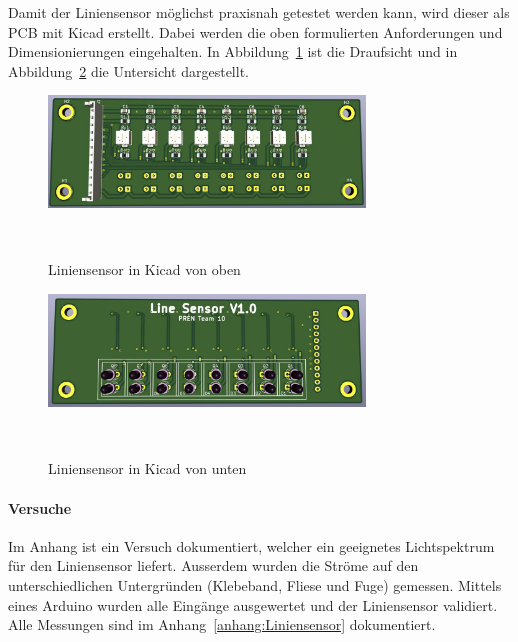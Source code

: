 \documentclass[main.tex]{subfiles} %
\begin{document}
Damit der Liniensensor möglichst praxisnah getestet 
werden kann, wird dieser als PCB mit Kicad erstellt. Dabei werden die 
oben formulierten Anforderungen und Dimensionierungen eingehalten. In Abbildung~\ref{fig:Liniensensor_Top} 
ist die Draufsicht und in Abbildung~\ref{fig:Liniensensor_Bottom} die Untersicht dargestellt.

\begin{figure}[H]
    \centering
    \includegraphics[width=0.75\textwidth]{fig_Strecke_Tracken/Liniensensor_Top.pdf}
    \caption{Liniensensor in Kicad von oben}~\label{fig:Liniensensor_Top}
\end{figure}

\begin{figure}[H]
    \centering
    \includegraphics[width=0.75\textwidth]{fig_Strecke_Tracken/Liniensensor_Bottom.pdf}
    \caption{Liniensensor in Kicad von unten}~\label{fig:Liniensensor_Bottom}
\end{figure}





\paragraph{Versuche}
Im Anhang ist ein Versuch dokumentiert, welcher ein geeignetes Lichtspektrum für den Liniensensor liefert. Ausserdem wurden
die Ströme auf den unterschiedlichen Untergründen (Klebeband, Fliese und Fuge) gemessen. Mittels eines 
Arduino wurden alle Eingänge ausgewertet und der Liniensensor validiert. 
Alle Messungen sind im Anhang~\ref{anhang:Liniensensor} dokumentiert.

\end{document}
